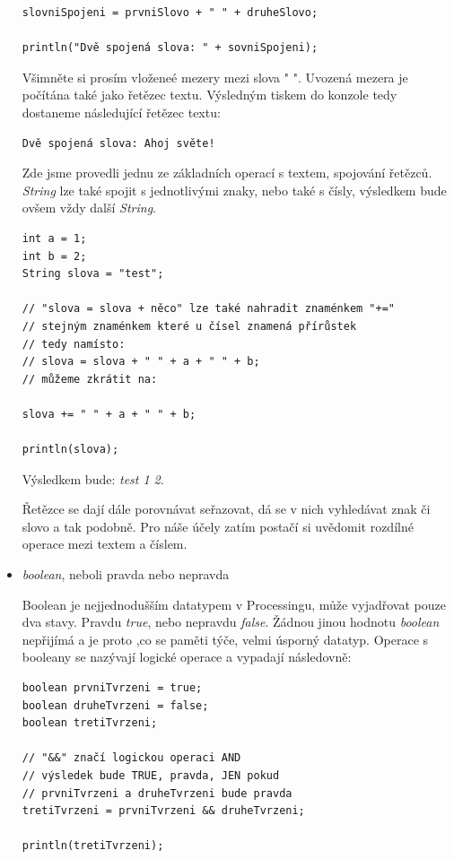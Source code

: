 \documentclass[11pt]{article}
\begin{document}
\begin{itemize}
\begin{lstlisting}
slovniSpojeni = prvniSlovo + " " + druheSlovo;

println("Dvě spojená slova: " + sovniSpojeni);
\end{lstlisting}

Všimněte si prosím vloženeé mezery mezi slova " ". Uvozená mezera je počítána také jako řetězec textu. Výsledným tiskem do konzole tedy dostaneme následující řetězec textu:

\begin{lstlisting}
Dvě spojená slova: Ahoj světe!
\end{lstlisting}

Zde jsme provedli jednu ze základních operací s textem, spojování řetězců. {\em String} lze také spojit s jednotlivými znaky, nebo také s čísly, výsledkem bude ovšem vždy další {\em String}.

\begin{lstlisting}
int a = 1;
int b = 2;
String slova = "test";

// "slova = slova + něco" lze také nahradit znaménkem "+="
// stejným znaménkem které u čísel znamená přírůstek
// tedy namísto:
// slova = slova + " " + a + " " + b;
// můžeme zkrátit na:

slova += " " + a + " " + b;

println(slova);
\end{lstlisting}

Výsledkem bude: {\em test 1 2}.

Řetězce se dají dále porovnávat seřazovat, dá se v nich vyhledávat znak či slovo a tak podobně. Pro náše účely zatím postačí si uvědomit rozdílné operace mezi textem a číslem.


\item{{\em boolean}, neboli pravda nebo nepravda}

Boolean je nejjednodušším datatypem v Processingu, může vyjadřovat pouze dva stavy. Pravdu {\em true}, nebo nepravdu {\em false}. Žádnou jinou hodnotu {\em boolean} nepřijímá a je proto  ,co se paměti týče, velmi úsporný datatyp. Operace s booleany se nazývají logické operace a vypadají následovně:


\begin{lstlisting}
boolean prvniTvrzeni = true;
boolean druheTvrzeni = false;
boolean tretiTvrzeni;

// "&&" značí logickou operaci AND
// výsledek bude TRUE, pravda, JEN pokud
// prvniTvrzeni a druheTvrzeni bude pravda
tretiTvrzeni = prvniTvrzeni && druheTvrzeni;

println(tretiTvrzeni);


\end{lstlisting}
\end{itemize}
\end{document}
